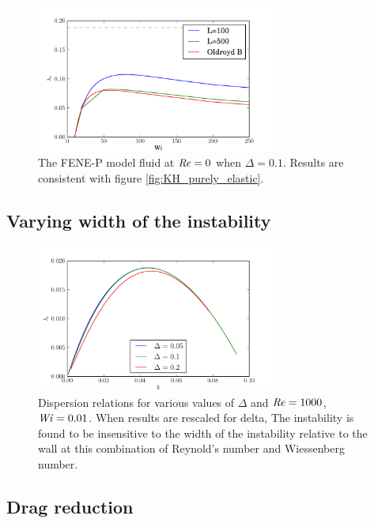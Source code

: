\documentclass{jfm}
\newcommand\Wi{\mbox{\textit{Wi}}}
\newcommand\Rey{\mbox{\textit{Re}}}  %
\begin{document}
\begin{figure}
    \centering
    \includegraphics[width=0.7\textwidth]{FENE_purely_elastic}
    \caption{
    The FENE-P model fluid at $\Rey = 0$  when $\Delta = 0.1$. Results are
    consistent with figure \ref{fig:KH_purely_elastic}.
    }
    \label{fig:FENE_low_Re}
\end{figure}

\subsection{Varying width of the instability}

\begin{figure}
    \centering
    \includegraphics[width=0.7\textwidth]{high_Re_vary_delta}
    \caption{ 
    Dispersion relations for various values of $\Delta$ and $\Rey = 1000$, $\Wi
    = 0.01$. When results are rescaled for delta, The instability is found to
    be insensitive to the width of the instability relative to the wall at this
    combination of Reynold's number and Wiessenberg number.
    }
    \label{fig:delta_dispersion}
\end{figure}


\subsection{Drag reduction}
\end{document}
